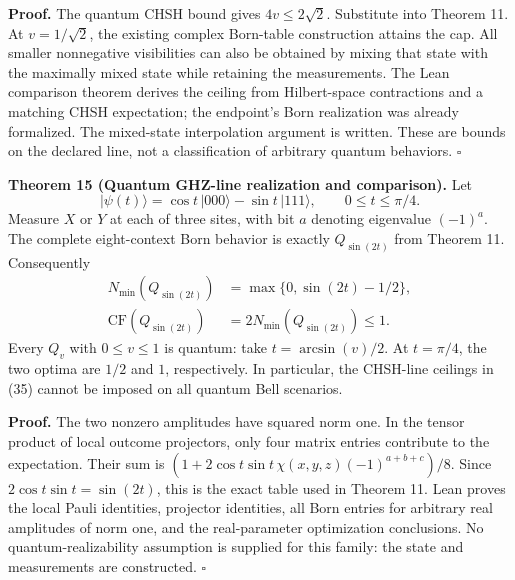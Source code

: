 \documentclass[
]{article}
\begin{document}
\textbf{Proof.} The quantum CHSH bound gives \(4v\le2\sqrt2\). Substitute into Theorem 11. At \(v=1/\sqrt2\), the existing complex Born-table construction attains the cap. All smaller nonnegative visibilities can also be obtained by mixing that state with the maximally mixed state while retaining the measurements. The Lean comparison theorem derives the ceiling from Hilbert-space contractions and a matching CHSH expectation; the endpoint's Born realization was already formalized. The mixed-state interpolation argument is written. These are bounds on the declared line, not a classification of arbitrary quantum behaviors. \(\square\)

\textbf{Theorem 15 (Quantum GHZ-line realization and comparison).} Let
\[
|\psi(t)\rangle=\cos t\,|000\rangle-\sin t\,|111\rangle,
\qquad 0\le t\le\pi/4.
\]
Measure \(X\) or \(Y\) at each of three sites, with bit \(a\) denoting eigenvalue \((-1)^a\). The complete eight-context Born behavior is exactly \(Q_{\sin(2t)}\) from Theorem 11. Consequently
\[
\begin{aligned}
N_{\min}(Q_{\sin(2t)})&=\max\{0,\sin(2t)-1/2\},\\
\mathrm{CF}(Q_{\sin(2t)})&=2N_{\min}(Q_{\sin(2t)})\le1.
\end{aligned}
\tag{36}
\]
Every \(Q_v\) with \(0\le v\le1\) is quantum: take \(t=\arcsin(v)/2\). At \(t=\pi/4\), the two optima are \(1/2\) and \(1\), respectively. In particular, the CHSH-line ceilings in (35) cannot be imposed on all quantum Bell scenarios.

\textbf{Proof.} The two nonzero amplitudes have squared norm one. In the tensor product of local outcome projectors, only four matrix entries contribute to the expectation. Their sum is \((1+2\cos t\sin t\,\chi(x,y,z)(-1)^{a+b+c})/8\). Since \(2\cos t\sin t=\sin(2t)\), this is the exact table used in Theorem 11. Lean proves the local Pauli identities, projector identities, all Born entries for arbitrary real amplitudes of norm one, and the real-parameter optimization conclusions. No quantum-realizability assumption is supplied for this family: the state and measurements are constructed. \(\square\)
\end{document}
